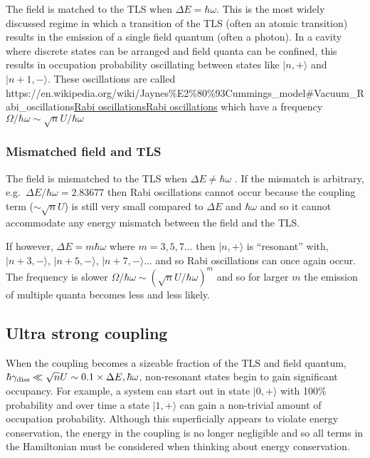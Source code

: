 \documentclass[
]{article}
\let\oldhref\href
\renewcommand{\href}[2]{\ifx#1\urlprefix\oldhref{#1}{#2}\else\uline{\oldhref{#1}{#2}}\fi}
\renewcommand{\[}{\begin{equation}}
\renewcommand{\]}{\end{equation}}
\begin{document}
The field is matched to the TLS when \(\Delta E = \hbar\omega\). This is
the most widely discussed regime in which a transition of the TLS (often
an atomic transition) results in the emission of a single field quantum
(often a photon). In a cavity where discrete states can be arranged and
field quanta can be confined, this results in occupation probability
oscillating between states like \(|n,+\rangle\) and \(|n+1,-\rangle\).
These oscillations are called
\href{https://en.wikipedia.org/wiki/Jaynes\%E2\%80\%93Cummings_model\#Vacuum_Rabi_oscillations}{Rabi
oscillations} which have a frequency
\(\Omega/\hbar\omega \sim \sqrt{n}U/\hbar\omega\)

\subsubsection{Mismatched field and TLS}\label{mismatched-field-and-tls}

The field is mismatched to the TLS when \(\Delta E \neq \hbar\omega\) .
If the mismatch is arbitrary, e.g.~\(\Delta E/ \hbar\omega = 2.83677\)
then Rabi oscillations cannot occur because the coupling term
(\(\sim \sqrt{n}U\)) is still very small compared to \(\Delta E\) and
\(\hbar\omega\) and so it cannot accommodate any energy mismatch between
the field and the TLS.

If however, \(\Delta E = m\hbar \omega\) where \(m=3, 5, 7 ...\) then
\(|n,+\rangle\) is ``resonant'' with, \(|n+3,-\rangle\),
\(|n+5,-\rangle\), \(|n+7,-\rangle ...\) and so Rabi oscillations can
once again occur. The frequency is slower
\(\Omega/\hbar\omega \sim (\sqrt{n}U/\hbar\omega)^m\) and so for larger
\(m\) the emission of multiple quanta becomes less and less likely.

\subsection{Ultra strong coupling}\label{ultra-strong-coupling-1}

When the coupling becomes a sizeable fraction of the TLS and field
quantum,
\(\hbar\gamma_{\rm diss} \ll \sqrt{n}U \sim 0.1 \times \Delta E , \hbar \omega\),
non-resonant states begin to gain significant occupancy. For example, a
system can start out in state \(|0,+\rangle\) with 100\% probability and
over time a state \(|1,+\rangle\) can gain a non-trivial amount of
occupation probability. Although this superficially appears to violate
energy conservation, the energy in the coupling is no longer negligible
and so all terms in the Hamiltonian must be considered when thinking
about energy conservation.
\end{document}
